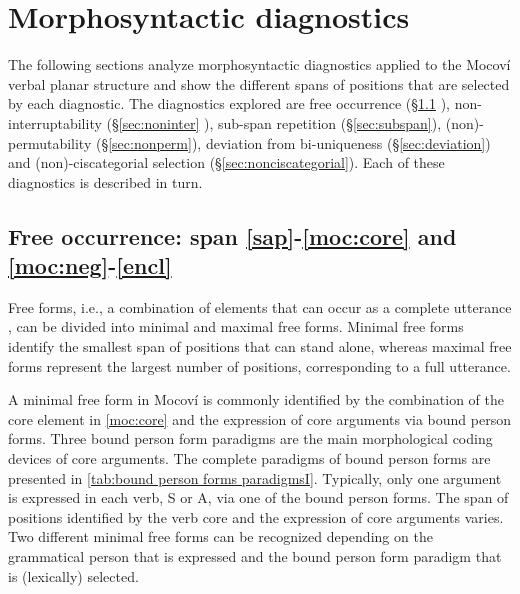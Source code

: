\documentclass[output=paper]{langscibook}
\begin{document}
\section{Morphosyntactic diagnostics}\label{sec:morphsyntactictests}
The following sections analyze morphosyntactic diagnostics applied to the Mocoví verbal planar structure and show the different spans of positions that are selected by each diagnostic. The diagnostics explored are free occurrence (\S\ref{sec:mocovi:freeoccurrence} ), non-interruptability (\S\ref{sec:noninter} ), sub-span repetition (\S\ref{sec:subspan}), (non)-permutability (\S\ref{sec:nonperm}), deviation from bi-uniqueness (\S\ref{sec:deviation}) and (non)-ciscategorial selection (\S\ref{sec:nonciscategorial}). Each of these diagnostics is described in turn. 


\subsection{Free occurrence: span \ref{sap}-\ref{moc:core} and \ref{moc:neg}-\ref{encl}}\label{sec:mocovi:freeoccurrence}
Free forms, i.e., a combination of elements that can occur as a complete utterance \citep[][18--19]{Tallman2020}, can be divided into minimal and maximal free forms. Minimal free forms identify the smallest span of positions that can stand alone, whereas maximal free forms represent the largest number of positions, corresponding to a full utterance.   

A minimal free form in Mocoví is commonly identified by the combination of the core element in \ref{moc:core} and the expression of core arguments via bound person forms. Three bound person form paradigms are the main morphological coding devices of core arguments.  The complete paradigms of bound person forms are presented in  \autoref{tab:bound person forms paradigmsI}. Typically, only one argument is expressed in each verb, S or A, via one of the bound person forms.  The span of positions identified by the verb core and the expression of core arguments varies. Two different minimal free forms can be recognized depending on the grammatical person that is expressed and the bound person form paradigm that is (lexically) selected.
\end{document}
